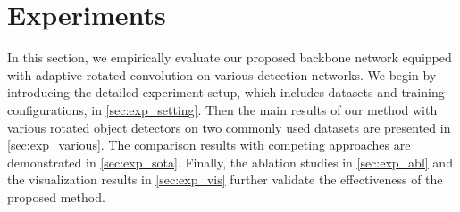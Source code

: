 


\section{Experiments}
\label{sec:exp}

In this section, we empirically evaluate our proposed backbone network equipped with adaptive rotated convolution on various detection networks. We begin by introducing the detailed experiment setup, which includes datasets and training configurations, in \cref{sec:exp_setting}. Then the main results of our method with various rotated object detectors on two commonly used datasets are presented in \cref{sec:exp_various}. The comparison results with competing approaches are demonstrated in \cref{sec:exp_sota}. Finally, the ablation studies in \cref{sec:exp_abl} and the visualization results in \cref{sec:exp_vis} further validate the effectiveness of the proposed method.





